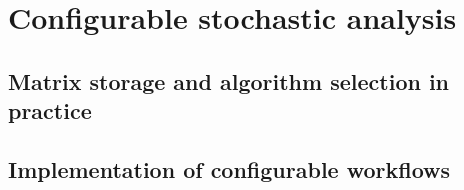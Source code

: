\chapter{Configurable stochastic analysis}
\label{chap:configurable}

\section{Matrix storage and algorithm selection in practice}

\section{Implementation of configurable workflows}